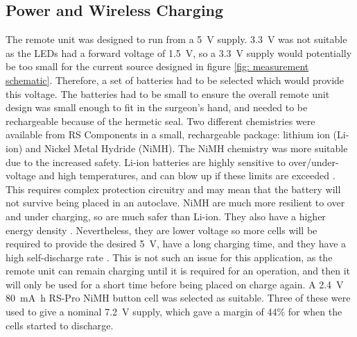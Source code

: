 \subsection{Power and Wireless Charging} \label{power}
The remote unit was designed to run from a \SI{5}{\volt} supply. \SI{3.3}{\volt} was not suitable as the LEDs had a forward voltage of \SI{1.5}{\volt}, so a \SI{3.3}{\volt} supply would potentially be too small for the current source designed in figure \ref{fig: measurement schematic}. Therefore, a set of batteries had to be selected which would provide this voltage. The batteries had to be small to ensure the overall remote unit design was small enough to fit in the surgeon's hand, and needed to be rechargeable because of the hermetic seal. Two different chemistries were available from RS Components \cite{rs} in a small, rechargeable package: lithium ion (Li-ion) and Nickel Metal Hydride (NiMH). The NiMH chemistry was more suitable due to the increased safety. Li-ion batteries are highly sensitive to over/under-voltage and high temperatures, and can blow up if these limits are exceeded \cite{batteries}. This requires complex protection circuitry and may mean that the battery will not survive being placed in an autoclave. NiMH are much more resilient to over and under charging, so are much safer than Li-ion. They also have a higher energy density \cite{batteries}. Nevertheless, they are lower voltage so more cells will be required to provide the desired \SI{5}{\volt}, have a long charging time, and they have a high self-discharge rate \cite{batteries}. This is not such an issue for this application, as the remote unit can remain charging until it is required for an operation, and then it will only be used for a short time before being placed on charge again. A \SI{2.4}{\volt} \SI{80}{\milli\ampere\hour} RS-Pro NiMH button cell \cite{rs_pro_batteries} was selected as suitable. Three of these were used to give a nominal \SI{7.2}{\volt} supply, which gave a margin of 44\% for when the cells started to discharge.\\

